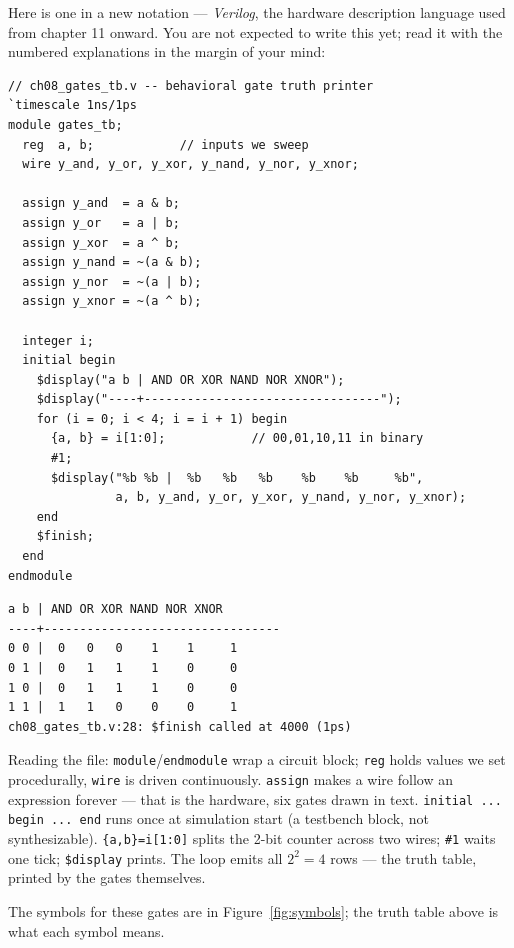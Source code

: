 Here is one in a new notation — \emph{Verilog}, the
hardware description language used from chapter 11 onward. You are not
expected to write this yet; read it with the numbered explanations in the
margin of your mind:

\begin{lstlisting}[caption={\ttfamily code/ch08\_gates\_tb.v --- a
behavioral truth printer. Every line explained below the output.},
label={lst:gatestb},abovecaptionskip=0pt]
// ch08_gates_tb.v -- behavioral gate truth printer
`timescale 1ns/1ps
module gates_tb;
  reg  a, b;            // inputs we sweep
  wire y_and, y_or, y_xor, y_nand, y_nor, y_xnor;

  assign y_and  = a & b;
  assign y_or   = a | b;
  assign y_xor  = a ^ b;
  assign y_nand = ~(a & b);
  assign y_nor  = ~(a | b);
  assign y_xnor = ~(a ^ b);

  integer i;
  initial begin
    $display("a b | AND OR XOR NAND NOR XNOR");
    $display("----+---------------------------------");
    for (i = 0; i < 4; i = i + 1) begin
      {a, b} = i[1:0];            // 00,01,10,11 in binary
      #1;
      $display("%b %b |  %b   %b   %b    %b    %b     %b",
               a, b, y_and, y_or, y_xor, y_nand, y_nor, y_xnor);
    end
    $finish;
  end
endmodule
\end{lstlisting}

\begin{lstlisting}[caption={Real output of
\texttt{iverilog -o gates\_tb ch08\_gates\_tb.v \&\& vvp gates\_tb}},
abovecaptionskip=0pt]
a b | AND OR XOR NAND NOR XNOR
----+---------------------------------
0 0 |  0   0   0    1    1     1
0 1 |  0   1   1    1    0     0
1 0 |  0   1   1    1    0     0
1 1 |  1   1   0    0    0     1
ch08_gates_tb.v:28: $finish called at 4000 (1ps)
\end{lstlisting}

Reading the file: \texttt{module}/\texttt{endmodule} wrap a circuit block;
\texttt{reg} holds values we set procedurally, \texttt{wire} is driven
continuously. \texttt{assign} makes a wire follow an expression
forever — that is the hardware, six gates drawn in text.
\texttt{initial ... begin ... end} runs once at simulation start (a
testbench block, not synthesizable). \texttt{\{a,b\}=i[1:0]} splits the
2-bit counter across two wires; \texttt{\#1} waits one tick;
\texttt{\$display} prints. The loop emits all $2^2=4$ rows — the truth
table, printed by the gates themselves.

The symbols for these gates are in Figure~\ref{fig:symbols}; the truth
table above is what each symbol means.

